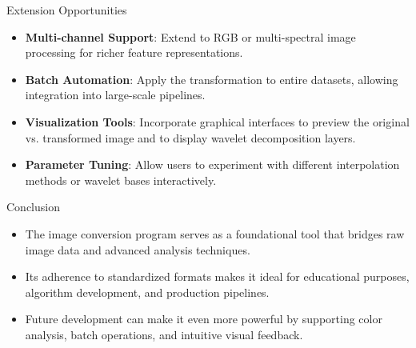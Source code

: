 \documentclass{beamer}
\begin{document}
\begin{frame}{Extension Opportunities}
    \begin{itemize}
        \item \textbf{Multi-channel Support}: Extend to RGB or multi-spectral image processing for richer feature representations.
        \item \textbf{Batch Automation}: Apply the transformation to entire datasets, allowing integration into large-scale pipelines.
        \item \textbf{Visualization Tools}: Incorporate graphical interfaces to preview the original vs. transformed image and to display wavelet decomposition layers.
        \item \textbf{Parameter Tuning}: Allow users to experiment with different interpolation methods or wavelet bases interactively.
    \end{itemize}
\end{frame}

\begin{frame}{Conclusion}
    \begin{itemize}
        \item The image conversion program serves as a foundational tool that bridges raw image data and advanced analysis techniques.
        \item Its adherence to standardized formats makes it ideal for educational purposes, algorithm development, and production pipelines.
        \item Future development can make it even more powerful by supporting color analysis, batch operations, and intuitive visual feedback.
    \end{itemize}
\end{frame}
\end{document}
